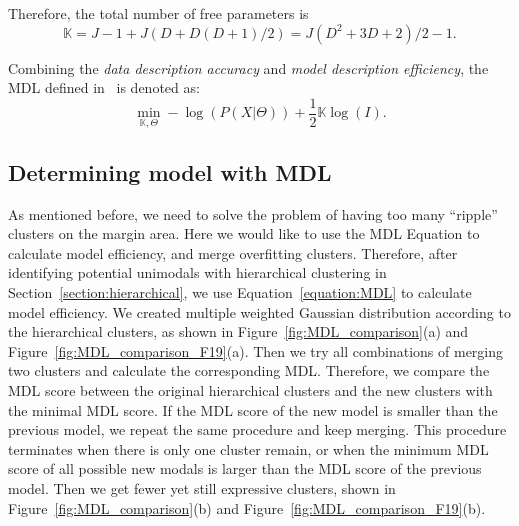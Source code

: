 Therefore, the total number of free parameters is
\begin{equation}
\mathbb{K} = J - 1 + J(D + D(D+1)/2) = J(D^2 + 3D + 2)/2 -1.
\end{equation}


Combining the \textit{data description accuracy} and \textit{model description efficiency}, 
the MDL defined in~\cite{Rissanen:1984:Universal} is denoted as:
\begin{equation}
\min_{\mathbb{K}, \Theta} - \log (P(X|\Theta)) + \frac{1}{2}\mathbb{K}\log(I).
\end{equation}\label{equation:MDL}


\subsection{Determining model with MDL}
As mentioned before, we need to solve the problem of having too many ``ripple'' clusters on the margin area.
Here we would like to use the MDL Equation to calculate model efficiency, and merge overfitting clusters.
Therefore, after identifying potential unimodals with hierarchical clustering in Section~\ref{section:hierarchical},
we use Equation~\ref{equation:MDL} to calculate model efficiency.
We created multiple weighted Gaussian distribution according to the hierarchical clusters, 
as shown in Figure~\ref{fig:MDL_comparison}(a) and Figure~\ref{fig:MDL_comparison_F19}(a).
Then we try all combinations of merging two clusters and calculate the corresponding MDL.
Therefore, we compare the MDL score between the original hierarchical clusters and the new clusters with the minimal MDL score.
If the MDL score of the new model is smaller than the previous model, we repeat the same procedure and keep merging.
This procedure terminates when there is only one cluster remain, or when the minimum MDL score of all possible new modals is larger than the MDL score of the previous model.
Then we get fewer yet still expressive clusters, 
shown in Figure~\ref{fig:MDL_comparison}(b) and Figure~\ref{fig:MDL_comparison_F19}(b).















